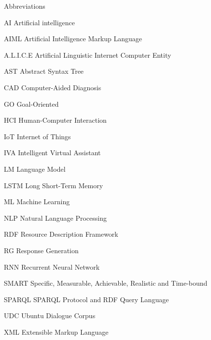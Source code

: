 \begin{dictionary}{Abbreviations}
\item[AI]			Artificial intelligence
\item[AIML]			Artificial Intelligence Markup Language
\item[A.L.I.C.E]	Artificial Linguistic Internet Computer Entity
\item[AST]			Abstract Syntax Tree
\item[CAD]			Computer-Aided Diagnosis
\item[GO]			Goal-Oriented
\item[HCI]			Human-Computer Interaction
\item[IoT]			Internet of Things
\item[IVA]			Intelligent Virtual Assistant
\item[LM]			Language Model
\item[LSTM]			Long Short-Term Memory
\item[ML]			Machine Learning
\item[NLP]			Natural Language Processing
\item[RDF]			Resource Description Framework
\item[RG]			Response Generation
\item[RNN]			Recurrent Neural Network
\item[SMART]		Specific, Measurable, Achievable, Realistic and Time-bound
\item[SPARQL]		SPARQL Protocol and RDF Query Language
\item[UDC]			Ubuntu Dialogue Corpus
\item[XML]			Extensible Markup Language

\end{dictionary}